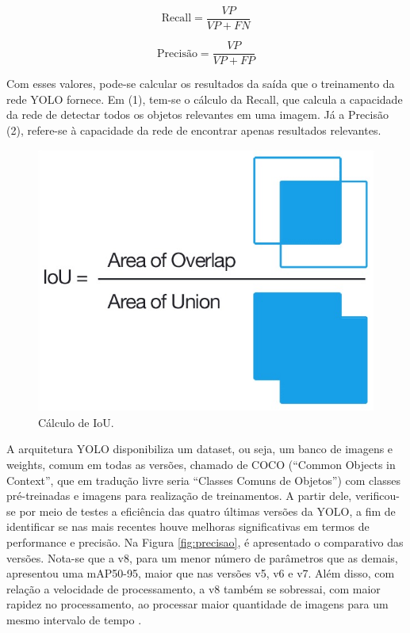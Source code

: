 \begin{equation}
    \text{Recall} = \frac{VP}{VP + FN} \tag{1}
\end{equation}
    
\begin{equation}
    \text{Precisão} = \frac{VP}{VP + FP} \tag{2}
\end{equation}

Com esses valores, pode-se calcular os resultados da saída que o treinamento da rede YOLO fornece. Em (1), tem-se o cálculo da Recall, que calcula a capacidade da rede de detectar todos os objetos relevantes em uma imagem. Já a Precisão (2), refere-se à capacidade da rede de encontrar apenas resultados relevantes. 

\begin{figure}[!h]
    \center
    \begin{minipage}{0.6\linewidth}
    \center
    \captionsetup{justification=centering,margin=0.5cm,font=small}
    \includegraphics[width=0.7\linewidth]{img/cap2/iou.png}
    \caption{ Cálculo de IoU. \cite{padilla2020survey}}
    \label{fig:iou}
    \end{minipage}
\end{figure}

A arquitetura YOLO disponibiliza um dataset, ou seja, um banco de imagens e weights, comum em todas as versões, chamado de COCO (“Common Objects in Context”, que em tradução livre seria “Classes Comuns de Objetos”) com classes pré-treinadas e imagens para realização de treinamentos. A partir dele, verificou-se por meio de testes a eficiência das quatro últimas versões da YOLO, a fim de identificar se nas mais recentes houve melhoras significativas em termos de performance e precisão. Na Figura \ref{fig:precisao}, é apresentado o comparativo das versões. Nota-se que a v8, para um menor número de parâmetros que as demais, apresentou uma mAP50-95, maior que nas versões v5, v6 e v7. Além disso, com relação a velocidade de processamento, a v8 também se sobressai, com maior rapidez no processamento, ao processar maior quantidade de imagens para um mesmo intervalo de tempo \cite{padilla2020survey}.

